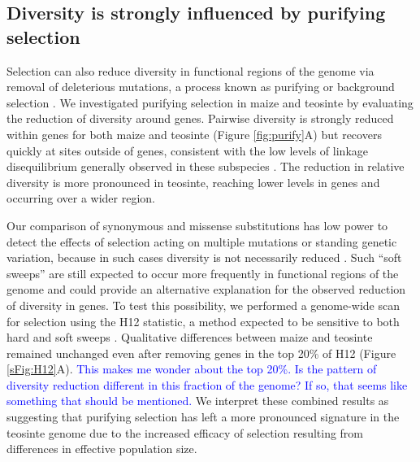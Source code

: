 \documentclass{pnastwo}
\newcommand{\mbh}[1]{\textcolor{blue}{\scriptsize #1}}
\begin{document}
\begin{article}
\subsection{Diversity is strongly influenced by purifying selection} %

Selection can also reduce diversity in functional regions of the genome via removal of deleterious mutations, a process known as purifying or background selection \cite{charlesworth1993}.
We investigated purifying selection in maize and teosinte by evaluating the reduction of diversity around genes.
Pairwise diversity is strongly reduced within genes for both maize and teosinte (Figure \ref{fig:purify}A) but recovers quickly at sites outside of genes, consistent with the low levels of linkage disequilibrium generally observed in these subspecies \cite{tenaillon2002,chia2012}. 
The reduction in relative diversity is more pronounced in teosinte, reaching lower levels in genes and occurring over a wider region.  

Our comparison of synonymous and missense substitutions has low power to detect the effects of selection acting on multiple mutations or standing genetic variation, because in such cases diversity is not necessarily reduced \cite{innan2004,messer2013}. 
Such ``soft sweeps'' are still expected to occur more frequently in functional regions of the genome and could provide an alternative explanation for the observed reduction of diversity in genes. 
To test this possibility, we performed a genome-wide scan for selection using the H12 statistic, a method expected to be sensitive to both hard and soft sweeps \cite{garud2015}. 
Qualitative differences between maize and teosinte remained unchanged even after removing genes in the top 20\% of H12 (Figure \ref{sFig:H12}A).
\mbh{This makes me wonder about the top 20\%. Is the pattern of diversity reduction different in this fraction of the genome?  If so, that seems like something that should be mentioned.}
We interpret these combined results as suggesting that purifying selection has left a more pronounced signature in the teosinte genome due to the increased efficacy of selection resulting from differences in effective population size.


\end{article}
\end{document}
